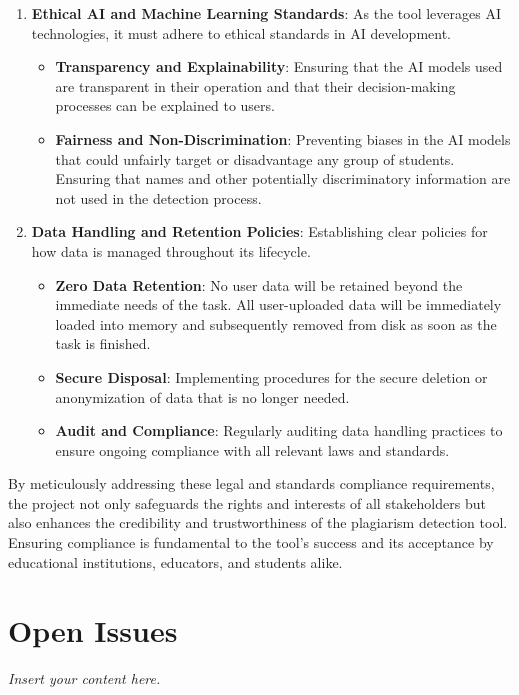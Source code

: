 \documentclass[12pt]{article}
\newcommand{\lips}{\textit{Insert your content here.}}
\begin{document}
\begin{enumerate}
    \item \textbf{Ethical AI and Machine Learning Standards}: As the tool leverages AI
    technologies, it must adhere to ethical standards in AI development.
    \begin{itemize}
        \item \textbf{Transparency and Explainability}: Ensuring that the AI models used
        are transparent in their operation and that their decision-making processes can be
        explained to users.
        \item \textbf{Fairness and Non-Discrimination}: Preventing biases in the AI models
        that could unfairly target or disadvantage any group of students. Ensuring that names
        and other potentially discriminatory information are not used in the detection process.
    \end{itemize}

    \item \textbf{Data Handling and Retention Policies}: Establishing clear policies for
    how data is managed throughout its lifecycle.
    \begin{itemize}
        \item \textbf{Zero Data Retention}: No user data will be retained beyond the immediate needs of the task.
        All user-uploaded data will be immediately loaded into memory and subsequently removed from disk as soon
        as the task is finished.
        \item \textbf{Secure Disposal}: Implementing procedures for the secure deletion or
        anonymization of data that is no longer needed.
        \item \textbf{Audit and Compliance}: Regularly auditing data handling practices to
        ensure ongoing compliance with all relevant laws and standards.
    \end{itemize}
\end{enumerate}

By meticulously addressing these legal and standards compliance requirements, the
project not only safeguards the rights and interests of all stakeholders but also
enhances the credibility and trustworthiness of the plagiarism detection tool. Ensuring
compliance is fundamental to the tool's success and its acceptance by educational
institutions, educators, and students alike.


\section{Open Issues}
\lips
\end{document}
